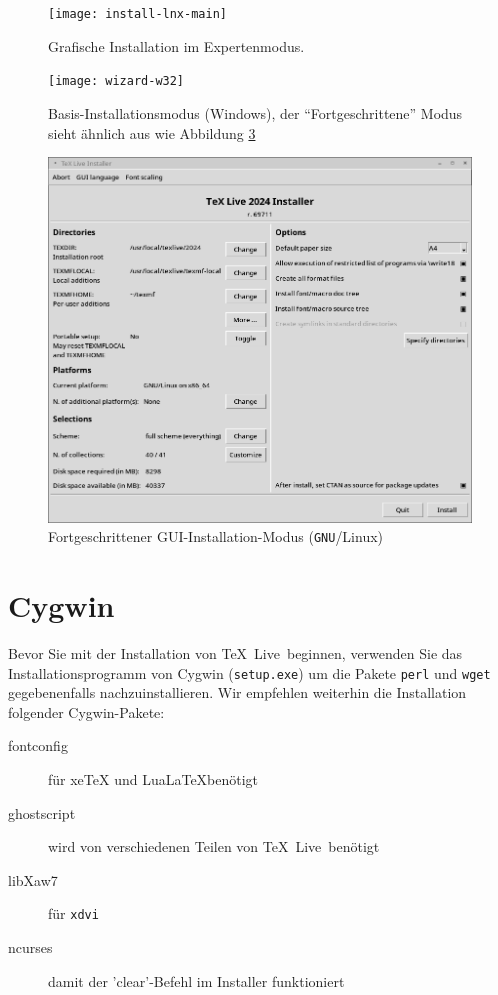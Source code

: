 \documentclass[12pt,ngerman,a4paper,fullparskip]{report}
\newcommand{\TL}{\TeX\ Live\xspace}
\newcommand{\acro}[1]{\texttt{#1}}
\newcommand{\code}[1]{\texttt{#1}}
\newcommand{\filename}[1]{\texttt{#1}}
\providecommand*{\GNU}{\acro{GNU}\xspace}
\providecommand*{\XeTeX}{xe\TeX\xspace}
\begin{document}
\begin{figure}[tb]
\texttt{[image: install-lnx-main]}
\caption{Grafische Installation im Expertenmodus.}\label{fig:gui-main}
\end{figure}

\begin{figure}[tb]
\texttt{[image: wizard-w32]}
\caption{Basis-Installationsmodus (Windows), der \enquote{Fortgeschrittene} Modus sieht ähnlich aus wie Abbildung
\ref{fig:advanced-lnx}}\label{fig:wizard-w32}
\end{figure}


\begin{figure}[tb]
\includegraphics[width={\linewidth}]{advanced-lnx}
\caption{Fortgeschrittener GUI-Installation-Modus (\GNU/Linux)}\label{fig:advanced-lnx}
\end{figure}

\section{Cygwin}\label{sec:cygwin}

Bevor Sie mit der Installation von \TL\ beginnen, verwenden Sie das
Installationsprogramm von Cygwin (\filename{setup.exe}) um die Pakete
\filename{perl} und \filename{wget} gegebenenfalls nachzuinstallieren.
Wir empfehlen weiterhin die Installation folgender Cygwin-Pakete:

\begin{description}
\item[fontconfig] für \XeTeX und Lua\LaTeX benötigt
\item[ghostscript] wird von verschiedenen Teilen von \TL\ benötigt
\item[libXaw7] für \code{xdvi}
\item[ncurses] damit der 'clear'-Befehl im Installer funktioniert
\end{description}
\end{document}
